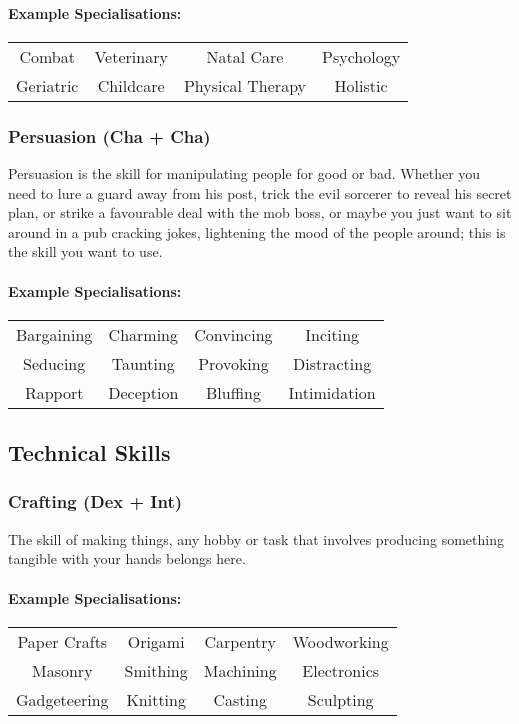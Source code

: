 \paragraph{Example Specialisations:}
\begin{center}
    \begin{tabular}{c|c|c|c}
        Combat & Veterinary & Natal Care & Psychology \\
        Geriatric & Childcare & Physical Therapy & Holistic \\
    \end{tabular}
\end{center}

\subsubsection{Persuasion (Cha + Cha)}
Persuasion is the skill for manipulating people for good or bad.
Whether you need to lure a guard away from his post, trick the evil sorcerer to reveal his secret plan, or strike a favourable deal with the mob boss, or maybe you just want to sit around in a pub cracking jokes, lightening the mood of the people around; this is the skill you want to use.

\paragraph{Example Specialisations:}
\begin{center}
    \begin{tabular}{c|c|c|c}
        Bargaining & Charming & Convincing & Inciting \\
        Seducing & Taunting & Provoking & Distracting \\
        Rapport & Deception & Bluffing & Intimidation
    \end{tabular}
\end{center}

\subsection{Technical Skills}
\subsubsection{Crafting (Dex + Int)}
The skill of making things, any hobby or task that involves producing something tangible with your hands belongs here.

\paragraph{Example Specialisations:}
\begin{center}
    \begin{tabular}{c|c|c|c}
        Paper Crafts & Origami & Carpentry & Woodworking \\
        Masonry & Smithing & Machining & Electronics \\
        Gadgeteering & Knitting & Casting & Sculpting \\
    \end{tabular}
\end{center}

